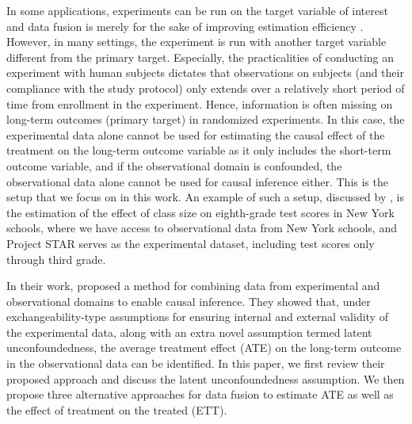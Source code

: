 \documentclass[10pt]{article}
\begin{document}
In some applications, experiments can be run on the target variable of interest and data fusion is merely for the sake of improving estimation efficiency \citep{kallus2020role}. However, in many settings, the experiment is run with another target variable different from the primary target. Especially, the practicalities of conducting an experiment with human subjects dictates that observations on subjects (and their compliance with the study protocol) only extends over a relatively short period of time from enrollment in the experiment.  Hence, information is often missing on long-term outcomes (primary target) in randomized experiments. In this case, the experimental data alone cannot be used for estimating the causal effect of the treatment on the long-term outcome variable as it only includes the short-term outcome variable, and if the observational domain is confounded, the observational data alone cannot be used for causal inference either. This is the setup that we focus on in this work. An example of such a setup, discussed by \cite{athey2020combining}, is the estimation of the effect of class size on eighth-grade test scores in New York schools, where we have access to observational data from New York schools, and Project STAR \citep{DVN/SIWH9F_2008} serves as the experimental dataset, including test scores only through third grade.

In their work, \cite{athey2020combining} proposed a method for combining data from experimental and observational domains to enable causal inference. They showed that, under exchangeability-type assumptions for ensuring internal and external validity of the experimental data, along with an extra novel assumption termed latent unconfoundedness, the average treatment effect (ATE) on the long-term outcome in the observational data can be identified. In this paper, we first review their proposed approach and discuss the latent unconfoundedness assumption. We then propose three alternative approaches for data fusion to estimate ATE as well as the effect of treatment on the treated (ETT). 
\end{document}
